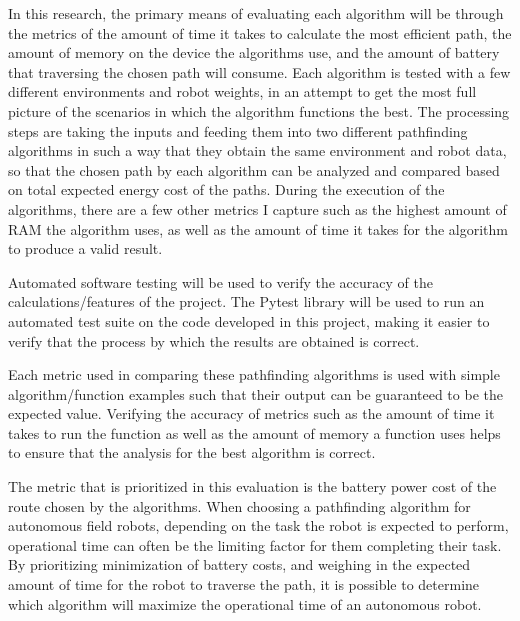 In this research, the primary means of evaluating each algorithm will be through the metrics of the amount of time it takes to calculate the most efficient path, the amount of memory on the device the algorithms use, and the amount of battery that traversing the chosen path will consume. Each algorithm is tested with a few different environments and robot weights, in an attempt to get the most full picture of the scenarios in which the algorithm functions the best. The processing steps are taking the inputs and feeding them into two different pathfinding algorithms in such a way that they obtain the same environment and robot data, so that the chosen path by each algorithm can be analyzed and compared based on total expected energy cost of the paths. During the execution of the algorithms, there are a few other metrics I capture such as the highest amount of RAM the algorithm uses, as well as the amount of time it takes for the algorithm to produce a valid result. 
\par
Automated software testing will be used to verify the accuracy of the calculations/features of the project. The Pytest \cite{pytest_2021} library will be used to run an automated test suite on the code developed in this project, making it easier to verify that the process by which the results are obtained is correct.
\par
Each metric used in comparing these pathfinding algorithms is used with simple algorithm/function examples such that their output can be guaranteed to be the expected value. Verifying the accuracy of metrics such as the amount of time it takes to run the function as well as the amount of memory a function uses helps to ensure that the analysis for the best algorithm is correct.
\par
The metric that is prioritized in this evaluation is the battery power cost of the route chosen by the algorithms. When choosing a pathfinding algorithm for autonomous field robots, depending on the task the robot is expected to perform, operational time can often be the limiting factor for them completing their task. By prioritizing minimization of battery costs, and weighing in the expected amount of time for the robot to traverse the path, it is possible to determine which algorithm will maximize the operational time of an autonomous robot.

